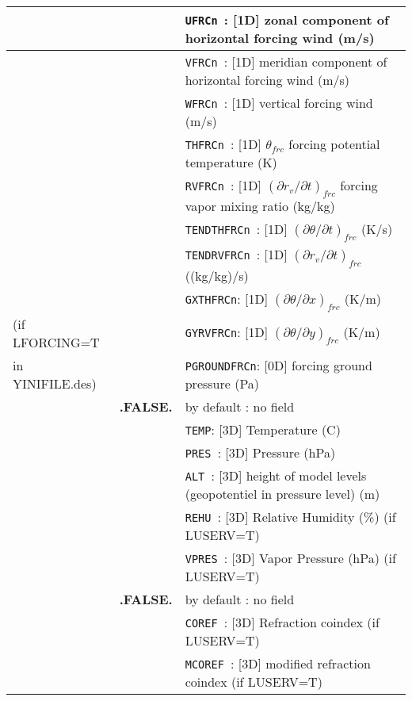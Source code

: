 \begin{center}
\begin{makeimage}
\begin{tabular}{|>{\centering}p{3cm}|>{\centering}p{2.5cm}|p{11cm}|}
&\multirow{10}{*}{.TRUE.} & {\tt UFRCn }: [1D]  zonal component of horizontal forcing wind (m/s)\\\cline{3-3}
& & {\tt VFRCn }: [1D]  meridian component of horizontal forcing wind (m/s)\\\cline{3-3}
& & {\tt WFRCn }: [1D] vertical forcing wind (m/s)\\\cline{3-3}
& & {\tt THFRCn }: [1D] $\theta_{frc}$ forcing potential temperature  (K)\\\cline{3-3}
& & {\tt RVFRCn }: [1D] $(\partial r_v/ \partial t)_{frc}$ forcing vapor mixing ratio (kg/kg)\\\cline{3-3}
& & {\tt TENDTHFRCn }: [1D] $(\partial\theta / \partial t)_{frc}$ (K/s)\\\cline{3-3}
& & {\tt TENDRVFRCn }: [1D] $(\partial r_v/ \partial t)_{frc}$ ((kg/kg)/s)\\\cline{3-3}
& & {\tt GXTHFRCn}: [1D] $(\partial\theta/ \partial x)_{frc}$ (K/m)\\\cline{3-3}
{\scriptsize (if LFORCING=T}& & {\tt GYRVFRCn}: [1D] $(\partial\theta/ \partial y)_{frc}$ (K/m)\\\cline{3-3}
{\scriptsize in YINIFILE.des)}& &{\tt PGROUNDFRCn}: [0D] forcing ground pressure (Pa) \\ \hline
\multirow{6}{*}{LTPZH}\index{LTPZH!\innam{NAM\_DIAG}}&\textbf{.FALSE.} & by default : no field\\\cline{2-3}
&\multirow{5}{*}{.TRUE.} &{\tt TEMP}: [3D] Temperature (C) \\\cline{3-3}
& &{\tt PRES }: [3D] Pressure (hPa)\\\cline{3-3}
& &{\tt ALT }: [3D] height of model levels (geopotentiel in pressure level) (m)\\\cline{3-3}
& &{\tt REHU }: [3D] Relative Humidity (\%) (if LUSERV=T) \\\cline{3-3}
& &{\tt VPRES }: [3D]  Vapor Pressure (hPa) (if LUSERV=T)\\ \hline
\multirow{3}{*}{LCOREF}\index{LCOREF!\innam{NAM\_DIAG}}&\textbf{.FALSE.} & by default : no field \\\cline{2-3}
&\multirow{2}{*}{.TRUE.} &{\tt COREF }: [3D] Refraction coindex (if LUSERV=T)\\\cline{3-3}
& &{\tt  MCOREF }: [3D] modified refraction coindex (if LUSERV=T)\\ \hline
\end{tabular}
\end{makeimage}
\end{center}

